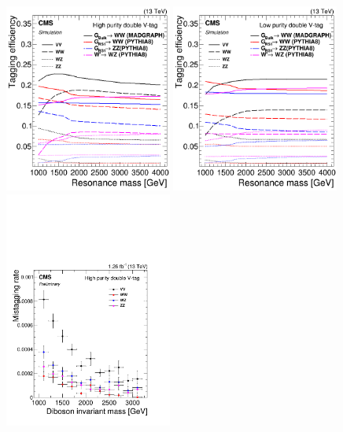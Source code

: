 \begin{figure}[htb]
\centering

\includegraphics[width=0.49\textwidth]{figures/analysis/search1/AN-15-211/HP_VV_SigEff.png}
\includegraphics[width=0.49\textwidth]{figures/analysis/search1/AN-15-211/LP_VV_SigEff.png}\\
\includegraphics[width=0.49\textwidth]{figures/analysis/search1/AN-15-211/QCD_HP_VV_MistaggingRateEff.pdf}

\end{figure}
